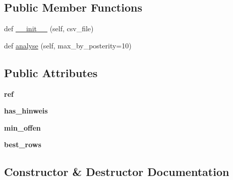 \subsection*{Public Member Functions}
\begin{DoxyCompactItemize}
\item 
def \hyperlink{classanalyse__combinations__of__ancestors_1_1Analyser_a877b72ffb4613bf9f2d0f9717433e587}{\+\_\+\+\_\+init\+\_\+\+\_\+} (self, csv\+\_\+file)
\item 
def \hyperlink{classanalyse__combinations__of__ancestors_1_1Analyser_a2bb7870a20c9c9d6d701556b92787059}{analyse} (self, max\+\_\+by\+\_\+posterity=10)
\end{DoxyCompactItemize}
\subsection*{Public Attributes}
\begin{DoxyCompactItemize}
\item 
\mbox{\label{classanalyse__combinations__of__ancestors_1_1Analyser_a25fb76f3af03084567625435fa02e435}} 
{\bfseries ref}
\item 
\mbox{\label{classanalyse__combinations__of__ancestors_1_1Analyser_a160ca764cec07d8aa0e35095b320127d}} 
{\bfseries has\+\_\+hinweis}
\item 
\mbox{\label{classanalyse__combinations__of__ancestors_1_1Analyser_a40c33c0b551a756d038b1a4223d14204}} 
{\bfseries min\+\_\+offen}
\item 
\mbox{\label{classanalyse__combinations__of__ancestors_1_1Analyser_ac36173001c005f16eaad4184bb4686a1}} 
{\bfseries best\+\_\+rows}
\end{DoxyCompactItemize}


\subsection{Constructor \& Destructor Documentation}
\mbox{\label{classanalyse__combinations__of__ancestors_1_1Analyser_a877b72ffb4613bf9f2d0f9717433e587}} 
